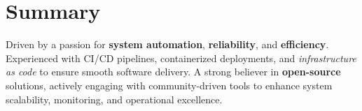 \section{Summary}

\begin{onecolentry}
	Driven by a passion for \textbf{system automation}, \textbf{reliability}, and \textbf{efficiency}.
	Experienced with CI/CD pipelines, containerized deployments, and \textit{infrastructure as code} to ensure
	smooth software delivery. A strong believer in \textbf{open-source} solutions, actively engaging with
	community-driven tools to enhance system scalability, monitoring, and operational excellence.
\end{onecolentry}
